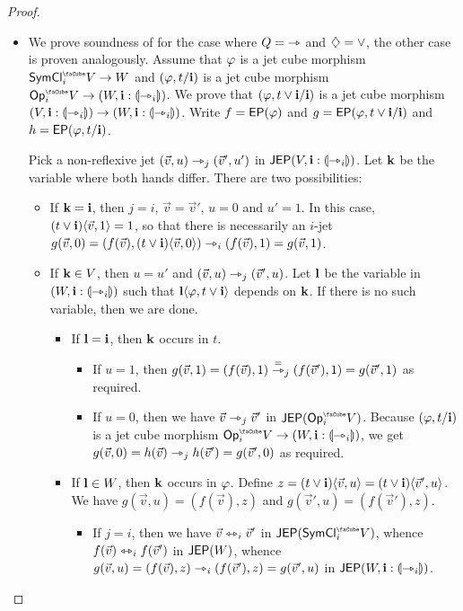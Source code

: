 \documentclass[a4paper]{memoir}
\begin{document}
\begin{proof}
\begin{itemize}
		\item We prove soundness of  for the case where $Q = {\rightarrowtriangle}$ and $\mathbin{\diamondsuit} = \vee$, the other case is proven analogously.
		Assume that $\varphi$ is a jet cube morphism $\UFsymcube_i V \to W$ and $(\varphi, t / \mathbf{i})$ is a jet cube morphism $\Opcube_i V \to (W, \dm i : \rival{\jet_i})$.
		We prove that $(\varphi, t \vee \mathbf{i} / \mathbf{i})$ is a jet cube morphism $(V, \mathbf{i} : {\llparenthesis \rightarrowtriangle_i \rrparenthesis}) \to (W, \mathbf{i} : {\llparenthesis \rightarrowtriangle_i \rrparenthesis})$.
		Write $f = \mathsf{EP}(\varphi)$ and $g = \mathsf{EP}(\varphi, t \vee \mathbf{i} / \mathbf{i})$ and $h = \mathsf{EP}(\varphi, t / \mathbf{i})$.
		
		Pick a non-reflexive jet $(\vec v, u) \rightarrowtriangle_j (\vec v', u')$ in $\mathsf{JEP}(V, \mathbf{i} : {\llparenthesis \rightarrowtriangle_i \rrparenthesis})$.
		Let $\mathbf{k}$ be the variable where both hands differ.
		There are two possibilities:
		\begin{itemize}
			\item If $\mathbf{k} = \mathbf{i}$, then $j = i$, $\vec v = \vec v'$, $u = 0$ and $u' = 1$.
			In this case, $(t \vee \mathbf{i}) \langle \vec v, 1 \rangle = 1$, so that there is necessarily an $i$-jet $g(\vec v, 0) = (f(\vec v), (t \vee \mathbf{i}) \langle \vec v, 0 \rangle) \rightarrowtriangle_i (f(\vec v), 1) = g(\vec v, 1)$.
			\item If $\mathbf{k} \in V$, then $u = u'$ and $(\vec v, u) \rightarrowtriangle_j (\vec v', u)$. Let $\mathbf{l}$ be the variable in $(W, \mathbf{i} : {\llparenthesis \rightarrowtriangle_i \rrparenthesis})$ such that $\mathbf{l} \langle \varphi, t \vee \mathbf{i} \rangle$ depends on $\mathbf{k}$.
			If there is no such variable, then we are done.
			\begin{itemize}
				\item If $\mathbf{l} = \mathbf{i}$, then $\mathbf{k}$ occurs in $t$.
				\begin{itemize}
					\item If $u = 1$, then $g(\vec v, 1) = (f(\vec v), 1) \overset{=}{\rightarrowtriangle}_j (f(\vec v'), 1) = g(\vec v', 1)$ as required.
					\item If $u = 0$, then we have $\vec v \rightarrowtriangle_j \vec v'$ in $\JEP(\Opcube_i V)$.
					Because $(\varphi, t / \mathbf{i})$ is a jet cube morphism $\Opcube_i V \to (W, \dm i : \rival{\jet_i})$, we get
					$g(\vec v, 0) = h(\vec v) \rightarrowtriangle_j h(\vec v') = g(\vec v', 0)$ as required.
				\end{itemize}
				\item If $\mathbf{l} \in W$, then $\mathbf{k}$ occurs in $\varphi$.
				Define $z = (t \vee \mathbf{i}) \langle \vec v, u \rangle = (t \vee \mathbf{i}) \langle \vec v', u \rangle$.
				We have $g(\vec v, u) = (f(\vec v), z)$ and $g(\vec v', u) = (f(\vec v'), z)$.
				\begin{itemize}
					\item If $j = i$, then we have $\vec v \leftrightarrowtriangle_i \vec v'$ in $\JEP(\UFsymcube_i V)$, whence $f(\vec v) \leftrightarrowtriangle_i f(\vec v')$ in $\mathsf{JEP}(W)$, whence $g(\vec v, u) = (f(\vec v), z) \rightarrowtriangle_i (f(\vec v'), z) = g(\vec v', u)$ in $\mathsf{JEP}(W, \mathbf{i} : {\llparenthesis \rightarrowtriangle_i \rrparenthesis})$.

\end{itemize}
\end{itemize}
\end{itemize}
\end{itemize}
\end{proof}
\end{document}
